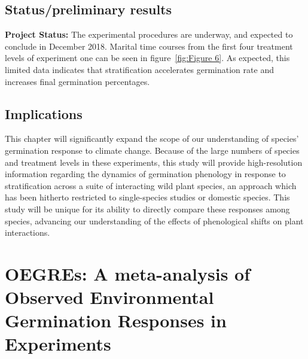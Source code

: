 \documentclass[12pt]{article}\usepackage[]{graphicx}\usepackage[]{color}
\begin{document}
\subsection*{Status/preliminary results}
\textbf{Project Status:} The experimental procedures are underway, and expected to conclude in December 2018. Marital time courses from the first four treatment levels of experiment one can be seen in figure~\ref{fig:Figure 6}. As expected, this limited data indicates that stratification accelerates germination rate and increases final germination percentages.\\
\subsection*{Implications}
\indent\indent This chapter will significantly expand the scope of our understanding of species' germination response to climate change. Because of the large numbers of species and treatment levels in these experiments, this study will provide high-resolution information regarding the dynamics of germination phenology in response to stratification across a suite of interacting wild plant species, an approach which has been hitherto restricted to single-species studies or domestic species. This study will be unique for its ability to directly compare these responses among species, advancing our understanding of the effects of phenological shifts on plant interactions.
\section*{OEGREs: A meta-analysis of Observed Environmental Germination Responses in Experiments}
\end{document}
